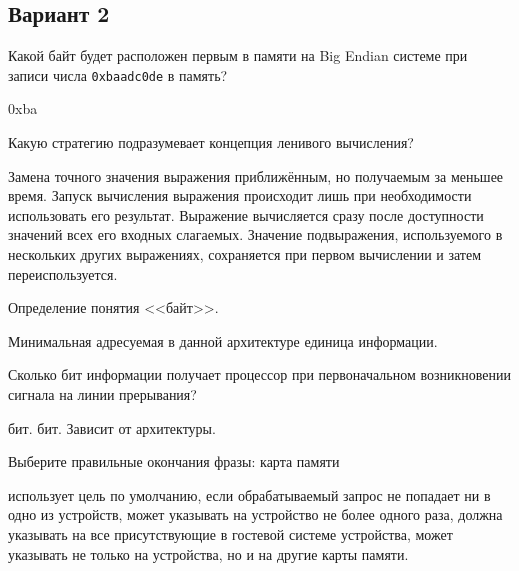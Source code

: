\subsection*{Вариант 2}

\begin{questions}

\question[3] Какой байт будет расположен первым в памяти на Big Endian системе при записи числа \texttt{0xbaadc0de} в память?
\begin{solution}[1cm]
0xba
\end{solution}


\question[3] Какую стратегию подразумевает концепция ленивого вычисления?
\begin{choices}
    \choice Замена точного значения выражения приближённым, но получаемым за меньшее время.
    \correctchoice Запуск вычисления выражения происходит лишь при необходимости использовать его результат.
    \choice Выражение вычисляется сразу после доступности значений всех его входных слагаемых.
    \choice Значение подвыражения, используемого в нескольких других выражениях, сохраняется при первом вычислении и затем переиспользуется.
\end{choices}

\question[3] Определение понятия <<байт>>.
\begin{solution}[1cm]
Минимальная адресуемая в данной архитектуре единица информации.
\end{solution}

\question[3] Сколько бит информации получает процессор при первоначальном возникновении сигнала на линии прерывания?
\begin{choices}
     бит.
     бит.
    \choice Зависит от архитектуры.
\end{choices}

\question[3] Выберите правильные окончания фразы: карта памяти
\begin{choices}
    \correctchoice использует цель по умолчанию, если обрабатываемый запрос не попадает ни в одно из устройств,
    \choice может указывать на устройство не более одного раза,
    \choice должна указывать на все присутствующие в гостевой системе устройства,
    \correctchoice может указывать не только на устройства, но и на другие карты памяти.
\end{choices}


\end{questions}


